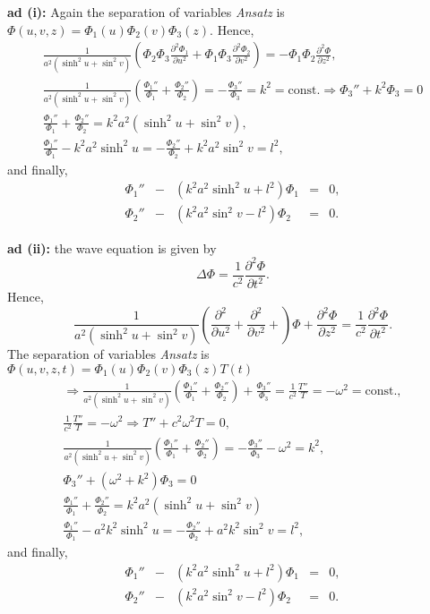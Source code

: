 {\begin{enumerate}
\end{enumerate}

{\bf ad (i):}
Again the separation of variables {\it Ansatz} is $\Phi(u,v,z)=\Phi_1(u)\Phi_2(v)\Phi_3(z)$.
Hence,
\begin{equation}
\begin{array}  {l}
  \frac{1}{a^2(\sinh^2u+\sin^2v)}
  \left(
    \Phi_2\Phi_3\frac{\partial^2\Phi_1}{\partial u^2}+
    \Phi_1\Phi_3\frac{\partial^2\Phi_2}{\partial v^2}
  \right)
  =-\Phi_1\Phi_2\frac{\partial^2\Phi}{\partial z^2},
\\
  \frac{1}{a^2(\sinh^2u+\sin^2v)}
  \left(
    \frac{\Phi_1''}{\Phi_1}+
    \frac{\Phi_2''}{\Phi_2}
  \right)=
  -\frac{\Phi_3''}{\Phi_3}=k^2=\mbox{const.}
  \Longrightarrow \Phi_3''+k^2\Phi_3=0
\\
  \frac{\Phi_1''}{\Phi_1}+
  \frac{\Phi_2''}{\Phi_2}=k^2a^2(\sinh^2u+\sin^2v),
\\
  \frac{\Phi_1''}{\Phi_1}-k^2a^2\sinh^2u=
  -\frac{\Phi_2''}{\Phi_2}+k^2a^2\sin^2v=l^2,
\end{array}
\end{equation}
and finally,
$$
  \begin{array}{rcccl}
    \Phi_1'' & - & (k^2a^2\sinh^2u+l^2)\Phi_1 & = & 0, \\
    \Phi_2'' & - & (k^2a^2\sin^2v-l^2)\Phi_2 & = & 0.
  \end{array}
$$


{\bf ad (ii):}
the wave equation is given by
$$
  \Delta\Phi=\frac{1}{c^2}\frac{\partial^2 \Phi}{\partial t^2}.
$$
Hence,
$$
  \frac{1}{a^2(\sinh^2u+\sin^2v)}
  \left(
    \frac{\partial^2}{\partial u^2}+\frac{\partial^2}{\partial v^2}+
  \right)\Phi+
  \frac{\partial^2 \Phi}{\partial z^2}=
  \frac{1}{c^2}\frac{\partial^2 \Phi}{\partial t^2}.
$$
The separation of variables {\it Ansatz} is  $\Phi (u,v,z,t)=\Phi_1(u)\Phi_2(v)\Phi_3(z)T(t)$
\begin{equation}
\begin{array}  {l}
  \Longrightarrow
  \frac{1}{a^2(\sinh^2u+\sin^2v)}
  \left(
    \frac{\Phi_1''}{\Phi_1}+
    \frac{\Phi_2''}{\Phi_2}
  \right)+
  \frac{\Phi_3''}{\Phi_3}=\frac{1}{c^2}\frac{T''}{T}=-\omega^2=\mbox{const.},
\\
  \frac{1}{c^2}\frac{T''}{T}=-\omega^2 \Longrightarrow T''+c^2\omega^2T=0,
\\
  \frac{1}{a^2(\sinh^2u+\sin^2v)}
  \left(
    \frac{\Phi_1''}{\Phi_1}+
    \frac{\Phi_2''}{\Phi_2}
  \right)=
  -\frac{\Phi_3''}{\Phi_3}-\omega^2=k^2,
\\
  \Phi_3''+(\omega^2+k^2)\Phi_3=0
\\
  \frac{\Phi_1''}{\Phi_1}+
  \frac{\Phi_2''}{\Phi_2}=k^2a^2(\sinh^2u+\sin^2v)
\\
  \frac{\Phi_1''}{\Phi_1}-a^2k^2\sinh^2u=
  -\frac{\Phi_2''}{\Phi_2}+a^2k^2\sin^2v=l^2,
\end{array}
\end{equation}
and finally,
$$
  \begin{array}{rcccl}
    \Phi_1'' & - & (k^2a^2\sinh^2u+l^2)\Phi_1 & = & 0, \\
    \Phi_2'' & - & (k^2a^2\sin^2v-l^2)\Phi_2 & = & 0.
  \end{array}
$$


}
